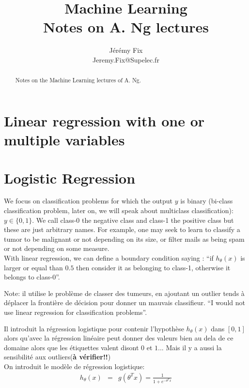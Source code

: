 \documentclass[10pt,a4paper]{article}
\title{Machine Learning \\ 
		\large \vspace*{-10pt} Notes on A. Ng lectures\vspace*{10pt}}
\author{%
	Jérémy Fix \\
	Jeremy.Fix@Supelec.fr \\
	\vspace{20pt}
	}
\makeatletter
\def\printtitle{%
    {\color{bl} \centering \huge \sc \textbf{\@title}\par}}		%
\def\printauthor{%
    {\centering \small \@author}}				%
\makeatother
\begin{document}
\printtitle 

\printauthor

\begin{abstract}
Notes on the Machine Learning lectures of A. Ng.
\end{abstract}

\tableofcontents

\pagebreak

\section{Linear regression with one or multiple variables}

\section{Logistic Regression}

We focus on classification problems for which the output $y$ is binary
(bi-class classification problem, later on, we will speak about
multiclass classification): $y \in \{0, 1\}$. We call class-0
the negative class and class-1 the positive class but these are just
arbitrary names. For example, one may seek to learn to classify a
tumor to be malignant or not depending on its size, or filter mails as
being spam or not depending on some measure.\\

With linear regression, we can define a boundary condition saying :
``if $h_\theta(x)$ is larger or equal than $0.5$ then consider it as
belonging to class-1, otherwise it belongs to class-0''.

Note:  il utilise le problème de classer des tumeurs, en ajoutant un
outlier tends à déplacer la frontière de décision pour donner un
mauvais classifieur. ``I would not use linear regression for
classification problems''. 

Il introduit la régression logistique pour contenir l'hypothèse
$h_\theta(x)$ dans $[0, 1]$ alors qu'avec la régression linéaire peut
donner des valeurs bien au dela de ce domaine alors que les étiquettes
valent disont $0$ et $1$... Mais il y a aussi la sensibilité aux
outliers(\textbf{à vérifier!!})\\


On introduit le modèle de régression logistique:
\begin{eqnarray}
h_\theta(x) &=& g(\theta^T x) = \frac{1}{1 + e^{-\theta^T x}}
\end{eqnarray}
\end{document}
